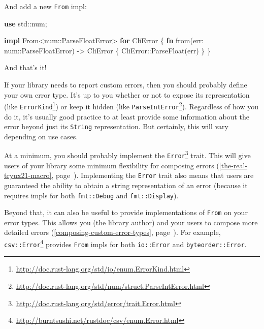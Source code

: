 \documentclass[a4paper,]{book}
\renewcommand*{\hyperref}[2][\ar]{%
  \def\ar{#2}%
  #2 (\autoref{#1}, page~\pageref{#1})}
\newenvironment{Shaded}{\begin{snugshade}}{\end{snugshade}}
\newcommand{\KeywordTok}[1]{\textcolor[rgb]{0.13,0.29,0.53}{\textbf{{#1}}}}
\newcommand{\NormalTok}[1]{{#1}}
\renewcommand{\href}[2]{#2\footnote{\url{#1}}}
\begin{document}
And add a new \texttt{From} impl:

\begin{Shaded}
\begin{Highlighting}[]

\KeywordTok{use} \NormalTok{std::num;}

\KeywordTok{impl} \NormalTok{From<num::ParseFloatError> }\KeywordTok{for} \NormalTok{CliError \{}
    \KeywordTok{fn} \NormalTok{from(err: num::ParseFloatError) -> CliError \{}
        \NormalTok{CliError::ParseFloat(err)}
    \NormalTok{\}}
\NormalTok{\}}
\end{Highlighting}
\end{Shaded}

And that's it!


If your library needs to report custom errors, then you should probably
define your own error type. It's up to you whether or not to expose its
representation (like
\href{http://doc.rust-lang.org/std/io/enum.ErrorKind.html}{\texttt{ErrorKind}})
or keep it hidden (like
\href{http://doc.rust-lang.org/std/num/struct.ParseIntError.html}{\texttt{ParseIntError}}).
Regardless of how you do it, it's usually good practice to at least
provide some information about the error beyond just its \texttt{String}
representation. But certainly, this will vary depending on use cases.

At a minimum, you should probably implement the
\href{http://doc.rust-lang.org/std/error/trait.Error.html}{\texttt{Error}}
trait. This will give users of your library some minimum flexibility for
\hyperref[the-real-tryux21-macro]{composing errors}. Implementing the
\texttt{Error} trait also means that users are guaranteed the ability to
obtain a string representation of an error (because it requires impls
for both \texttt{fmt::Debug} and \texttt{fmt::Display}).

Beyond that, it can also be useful to provide implementations of
\texttt{From} on your error types. This allows you (the library author)
and your users to \hyperref[composing-custom-error-types]{compose more
detailed errors}. For example,
\href{http://burntsushi.net/rustdoc/csv/enum.Error.html}{\texttt{csv::Error}}
provides \texttt{From} impls for both \texttt{io::Error} and
\texttt{byteorder::Error}.
\end{document}
